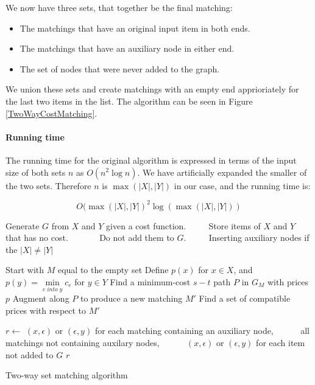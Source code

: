 \documentclass[11pt]{article}
\begin{document}
\endgroup

We now have three sets, that together be the final matching:
\begin{itemize}
   \item The matchings that have an original input item in both ends.
   \item The matchings that have an auxiliary node in either end.
   \item The set of nodes that were never added to the graph.
\end{itemize}

We union these sets and create matchings with an empty end apprioriately for the last two items in the list. The algorithm can be seen in Figure \ref{TwoWayCostMatching}.

\paragraph{Running time} The running time for the original algorithm is expressed in terms of the input size of both sets $n$ as $O(n^2 \log n)$. We have artificially expanded the smaller of the two sets. Therefore $n$ is $\max(|X|, |Y|)$ in our case, and the running time is:

\begin{equation}
O(\max(|X|, |Y|)^2 \log (\max(|X|, |Y|)) \nonumber
\end{equation}

\begin{algorithm}
\begin{algorithmic}
	\State Generate $G$ from $X$ and $Y$ given a cost function.
	\State ~~~~ Store items of $X$ and $Y$ that has no cost.
	\State ~~~~~~ Do not add them to $G$.
	\State ~~~~ Inserting auxiliary nodes if the $|X| \neq |Y|$


	\State Start with $M$ equal to the empty set
	\State Define $p(x)$ for $x \in X$, and  $p(y) = \underset{e \; into \; y}{\operatorname{min}} c_e$ for $y \in Y$
    	\State Find a minimum-cost $s-t$ path $P$ in $G_M$ with prices $p$
    	\State Augment along $P$ to produce a new matching $M'$
    	\State Find a set of compatible prices with respect to $M'$
    \EndWhile
    
	\State $r \gets $  $(x, \epsilon)$ or $(\epsilon, y)$ for each matching containing an auxiliary node, 
    \State ~~~~~ all matchings not containing auxilary nodes,
    \State ~~~~~ $(x, \epsilon)$ or $(\epsilon, y)$ for each item not added to $G$    
    \State \Return $r$
\EndFunction
\end{algorithmic}
\caption{Two-way set matching algorithm}
\label{TwoWayCostMatching}
\end{algorithm}
\end{document}
